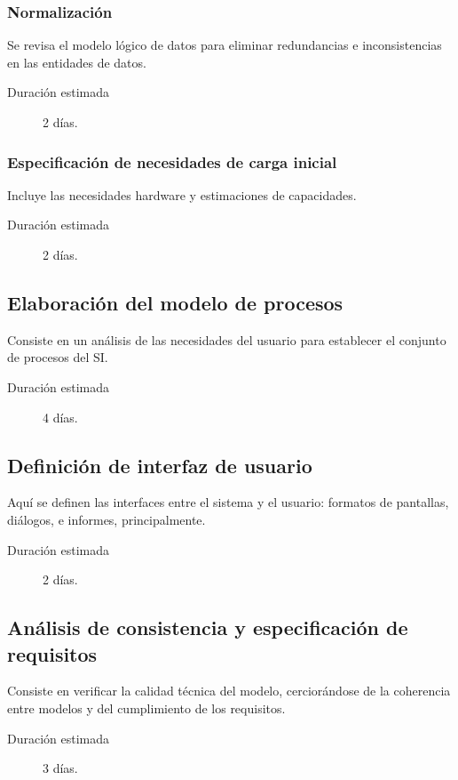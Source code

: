 \documentclass[11pt,a4paper,spanish,twoside]{report}
\begin{document}
\subsubsection{Normalización}
Se revisa el modelo lógico de datos para eliminar redundancias e
inconsistencias en las entidades de datos. 
\begin{description}
\item[Duración estimada] 2 días.
\end{description}

\subsubsection{Especificación de necesidades de carga inicial}
Incluye las necesidades hardware y estimaciones de capacidades.
\begin{description}
\item[Duración estimada] 2 días.
\end{description}

\subsection{Elaboración del modelo de procesos}
Consiste en un análisis de las necesidades del usuario para establecer el
conjunto de procesos del SI. 
\begin{description}
\item[Duración estimada] 4 días.
\end{description}

\subsection{Definición de interfaz de usuario}
Aquí se definen las interfaces entre el sistema y el usuario: formatos de
pantallas, diálogos, e informes, principalmente. 
    \begin{description}
\item[Duración estimada] 2 días.
\end{description}

\subsection{Análisis de consistencia y especificación de requisitos}
Consiste en verificar la calidad técnica del modelo, cerciorándose de la
coherencia entre modelos y del cumplimiento de los requisitos. 
\begin{description}
\item[Duración estimada] 3 días.
\end{description}
\end{document}
